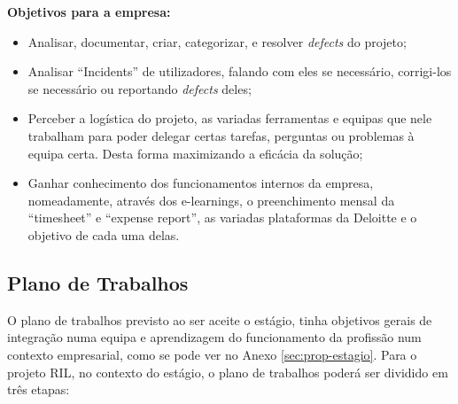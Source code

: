         \textbf{Objetivos para a empresa:}
        \begin{itemize}
          \item Analisar, documentar, criar, categorizar, e resolver \textit{defects} do projeto;
          \item Analisar ``Incidents'' de utilizadores, falando com eles se necessário, corrigi-los se necessário ou reportando \textit{defects} deles;
          \item Perceber a logística do projeto, as variadas ferramentas e equipas que nele trabalham para poder delegar certas tarefas, perguntas ou problemas à equipa certa. Desta forma maximizando a eficácia da solução;
          \item Ganhar conhecimento dos funcionamentos internos da empresa, nomeadamente, através dos e-learnings, o preenchimento mensal da ``timesheet'' e ``expense report'', as variadas plataformas da Deloitte e o objetivo de cada uma delas.
        \end{itemize}
    
    \subsection{Plano de Trabalhos}\label{subsec:plano-trabalhos}
          
        O plano de trabalhos previsto ao ser aceite o estágio, tinha objetivos gerais de integração numa equipa e aprendizagem do funcionamento da profissão num contexto empresarial, como se pode ver no Anexo \ref{sec:prop-estagio}. Para o projeto RIL, no contexto do estágio, o plano de trabalhos poderá ser dividido em três etapas:

